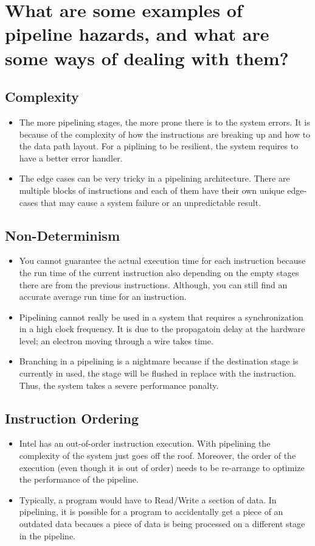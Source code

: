 \documentclass[letterpaper,10pt,titlepage,fleqn]{article}
\begin{document}
\section*{What are some examples of pipeline hazards, and what are some ways of dealing with them?}
\subsection*{Complexity}
\begin{itemize}
   \item The more pipelining stages, the more prone there is to the system errors. It is because of the 
      complexity of how the instructions are breaking up and how to the data path layout. For a piplining 
      to be resilient, the system requires to have a better error handler.  
   \item The edge cases can be very tricky in a pipelining architecture. There are multiple blocks
      of instructions and each of them have their own unique edge-cases that may cause a system failure or
      an unpredictable result.
\end{itemize}

\subsection*{Non-Determinism}
\begin{itemize}
   \item You cannot guarantee the actual execution time for each instruction because the run time of the 
      current instruction also depending on the empty stages there are from the previous instructions.
      Although, you can still find an accurate average run time for an instruction.
   \item Pipelining cannot really be used in a system that requires a synchronization in a high 
      clock frequency. It is due to the propagatoin delay at the hardware level; an electron moving 
      through a wire takes time. 
   \item Branching in a pipelining is a nightmare because if the destination stage is currently in used,
      the stage will be flushed in replace with the instruction. Thus, the system takes a severe 
      performance panalty.
\end{itemize}

\subsection*{Instruction Ordering}
\begin{itemize}
   \item Intel has an out-of-order instruction execution. With pipelining the complexity of the system just
      goes off the roof.  Moreover, the order of the execution (even though it is out of order) needs to be
      re-arrange to optimize the performance of the pipeline. 
   \item Typically, a program would have to Read/Write a section of data. In pipelining, it is possible for a
      program to accidentally get a piece of an outdated data becaues a piece of data is being processed on
      a different stage in the pipeline. 
\end{itemize}
\end{document}
